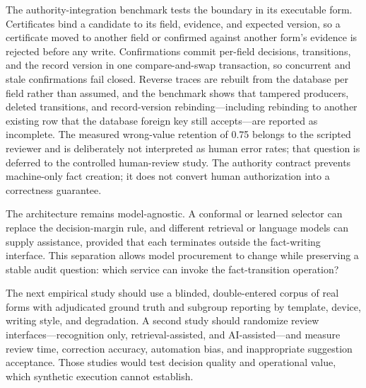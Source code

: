 The authority-integration benchmark tests the boundary in its executable form. Certificates bind a candidate to its field, evidence, and expected version, so a certificate moved to another field or confirmed against another form's evidence is rejected before any write. Confirmations commit per-field decisions, transitions, and the record version in one compare-and-swap transaction, so concurrent and stale confirmations fail closed. Reverse traces are rebuilt from the database per field rather than assumed, and the benchmark shows that tampered producers, deleted transitions, and record-version rebinding---including rebinding to another existing row that the database foreign key still accepts---are reported as incomplete. The measured wrong-value retention of 0.75 belongs to the scripted reviewer and is deliberately not interpreted as human error rates; that question is deferred to the controlled human-review study. The authority contract prevents machine-only fact creation; it does not convert human authorization into a correctness guarantee.


The architecture remains model-agnostic. A conformal or learned selector can replace the decision-margin rule, and different retrieval or language models can supply assistance, provided that each terminates outside the fact-writing interface. This separation allows model procurement to change while preserving a stable audit question: which service can invoke the fact-transition operation?

The next empirical study should use a blinded, double-entered corpus of real forms with adjudicated ground truth and subgroup reporting by template, device, writing style, and degradation. A second study should randomize review interfaces---recognition only, retrieval-assisted, and AI-assisted---and measure review time, correction accuracy, automation bias, and inappropriate suggestion acceptance. Those studies would test decision quality and operational value, which synthetic execution cannot establish.
